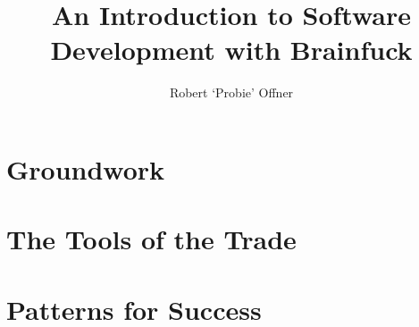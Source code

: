 \documentclass{book}[a4]
\title{An Introduction to Software Development with Brainfuck}
\author{Robert `Probie' Offner}
\begin{document}
\maketitle
\tableofcontents


\part{Groundwork}




\part{The Tools of the Trade}







\part{Patterns for Success}




\end{document}

